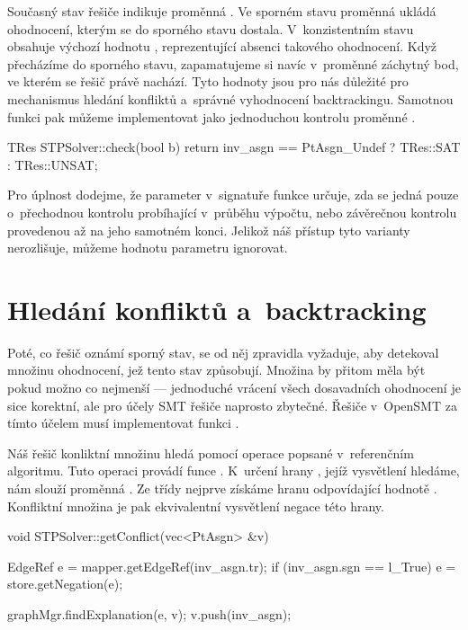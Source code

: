 Současný stav řešiče indikuje proměnná . Ve sporném stavu proměnná ukládá ohodnocení, kterým se do sporného stavu dostala. V~konzistentním stavu obsahuje výchozí hodnotu , reprezentující absenci takového ohodnocení. Když přecházíme do sporného stavu, zapamatujeme si navíc v~proměnné  záchytný bod, ve kterém se řešič právě nachází. Tyto hodnoty jsou pro nás důležité pro mechanismus hledání konfliktů a~správné vyhodnocení backtrackingu. Samotnou funkci  pak můžeme implementovat jako jednoduchou kontrolu proměnné .

\begin{code}
TRes STPSolver::check(bool b) { 
	return inv_asgn == PtAsgn_Undef ? TRes::SAT : TRes::UNSAT; 
}
\end{code}
Pro úplnost dodejme, že parameter  v~signatuře funkce  určuje, zda se jedná pouze o~přechodnou kontrolu probíhající v~průběhu výpočtu, nebo závěrečnou kontrolu provedenou až na jeho samotném konci. Jelikož náš přístup tyto varianty nerozlišuje, můžeme hodnotu parametru ignorovat.

\section{Hledání konfliktů a~backtracking}

Poté, co řešič oznámí sporný stav, se od něj zpravidla vyžaduje, aby detekoval množinu ohodnocení, jež tento stav způsobují. Množina by přitom měla být pokud možno co nejmenší --- jednoduché vrácení všech dosavadních ohodnocení je sice korektní, ale pro účely SMT řešiče naprosto zbytečné. Řešiče v~OpenSMT za tímto účelem musí implementovat funkci .

Náš řešič konliktní množinu hledá pomocí operace  popsané v~referenčním algoritmu. Tuto operaci provádí funce . K~určení hrany , jejíž vysvětlení hledáme, nám slouží proměnná . Ze třídy  nejprve získáme hranu odpovídající hodnotě . Konfliktní množina je pak ekvivalentní vysvětlení negace této hrany. 

\begin{code}
void STPSolver::getConflict(vec<PtAsgn> &v) {
	EdgeRef e = mapper.getEdgeRef(inv_asgn.tr);
	if (inv_asgn.sgn == l_True)
	    e = store.getNegation(e);
	
	graphMgr.findExplanation(e, v);
	v.push(inv_asgn);
}
\end{code}

